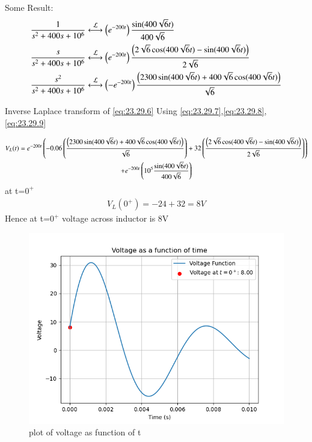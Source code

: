 \documentclass[journal,12pt,twocolumn]{IEEEtran}
\theoremstyle{remark}
\begin{document}
Some Result:
\begin{align}
\frac{1}{s^2+400s+10^6} &\system{L} \brak{e^{-200t}}\frac{\sin(400\sqrt{6}t)}{400\sqrt{6}}
   \label{eq:23.29.7}\\
\frac{s}{s^2+400s+10^6} &\system{L} \brak{e^{-200t}}\frac{\brak{2\sqrt{6}\cos(400\sqrt{6}t)-\sin(400\sqrt{6}t)}}{2\sqrt{6}}
   \label{eq:23.29.8}\\
\frac{s^2}{s^2+400s+10^6} &\system{L} \brak{-e^{-200t}}\frac{\brak{2300\sin(400\sqrt{6}t)+400\sqrt{6}\cos(400\sqrt{6}t)}}{\sqrt{6}}
   \label{eq:23.29.9}
\end{align}

Inverse Laplace transform of \eqref{eq:23.29.6} Using \eqref{eq:23.29.7},\eqref{eq:23.29.8}, \eqref{eq:23.29.9}

\begin{multline}
	V_L(t)=e^{-200t}\left(-0.06\left(\frac{\left(2300\sin(400\sqrt{6}t)+400\sqrt{6}\cos(400\sqrt{6}t)\right)}{\sqrt{6}}\right)+32\left(\frac{\left(2\sqrt{6}\cos(400\sqrt{6}t)-\sin(400\sqrt{6}t)\right)}{2\sqrt{6}}\right)\right)\\+e^{-200t}\left(10^5\frac{\sin(400\sqrt{6}t)}{400\sqrt{6}}\right)
\end{multline}
at t=$0^+$
\begin{align}
    V_L(0^+)= -24+32=8V
\end{align}
Hence at t=$0^+$ voltage across inductor is 8V
\begin{figure}[!h]
    \centering
    \includegraphics[width = \columnwidth]{2023/EE/29/figs/c.png}
    \caption{plot of voltage as function of t}
\end{figure}
\end{document}
